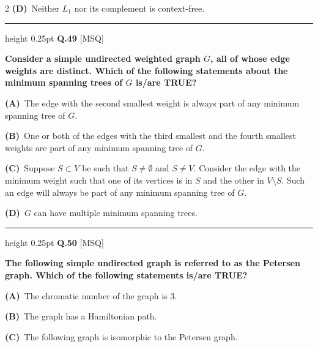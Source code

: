 \documentclass[a4paper,10pt,twoside]{article}
\begin{document}
\begin{multicols}{2}
\textbf{(D)}~Neither $L_1$ nor its complement is context-free.
\par\vspace{6pt}\hrule height 0.25pt\vspace{6pt}
\noindent\textbf{Q.49} \hfill {\footnotesize\textsf{[MSQ]}}
\par\vspace{2pt}
{\bfseries Consider a simple undirected weighted graph $G$, all of whose edge weights are distinct. Which of the following statements about the minimum spanning trees of $G$ is/are TRUE? \par}
\par\vspace{2pt}\noindent
\textbf{(A)}~The edge with the second smallest weight is always part of any minimum spanning tree of $G$.\par\vspace{2pt}\noindent
\textbf{(B)}~One or both of the edges with the third smallest and the fourth smallest weights are part of any minimum spanning tree of $G$.\par\vspace{2pt}\noindent
\textbf{(C)}~Suppose $S \subset V$ be such that $S \neq \emptyset$ and $S \neq V$. Consider the edge with the minimum weight such that one of its vertices is in $S$ and the other in $V \setminus S$. Such an edge will always be part of any minimum spanning tree of $G$.\par\vspace{2pt}\noindent
\textbf{(D)}~$G$ can have multiple minimum spanning trees.
\par\vspace{6pt}\hrule height 0.25pt\vspace{6pt}
\noindent\textbf{Q.50} \hfill {\footnotesize\textsf{[MSQ]}}
\par\vspace{2pt}
{\bfseries The following simple undirected graph is referred to as the Petersen graph. Which of the following statements is/are TRUE? \par}
\par\vspace{2pt}\noindent
\textbf{(A)}~The chromatic number of the graph is 3.\par\vspace{2pt}\noindent
\textbf{(B)}~The graph has a Hamiltonian path.\par\vspace{2pt}\noindent
\textbf{(C)}~The following graph is isomorphic to the Petersen graph.\par\vspace{2pt}\noindent

\end{multicols}
\end{document}

